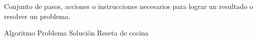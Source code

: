 
\question Conjunto de pasos, acciones o instrucciones necesarios para lograr 
un resultado  o resolver  un problema.

  \begin{oneparchoices}
    \CorrectChoice Algoritmo
    \choice Problema
    \choice Solución
    \choice Reseta de cocina
  \end{oneparchoices}
